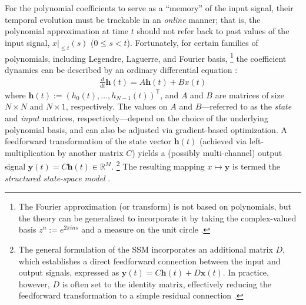 \documentclass[10pt,letterpaper]{article}
\begin{document}
For the polynomial coefficients to serve as a ``memory'' of the input signal, their temporal evolution must be trackable in an \emph{online} manner; that is, the polynomial approximation at time $t$ should not refer back to past values of the input signal, $x|_{\leq t}(s)$ ($0 \leq s <t$).
Fortunately, for certain families of polynomials, including Legendre, Laguerre, and Fourier basis,%
\footnote{
	The Fourier approximation (or transform) is not based on polynomials, but the theory can be generalized to incorporate it by taking the complex-valued basis $z^n := e^{2\pi ins}$ and a measure on the unit circle \citep{Gu+20}.
}
the coefficient dynamics can be described by an ordinary differential equation \citep[ODE;][]{Gu+20}:
\begin{align}
	\frac{d}{dt}\mathbf{h}(t) = A \mathbf{h}(t) + B x(t)
	\label{eq:ssm}
\end{align}
where $\mathbf{h}(t) := ( h_0(t), \dots, h_{N-1}(t) )^{\mathsf{T}}$,
and $A$ and $B$ are matrices of size $N \times N$ and $N \times 1$, respectively.
The values on $A$ and $B$---referred to as the \emph{state} and \emph{input} matrices, respectively---depend on the choice of the underlying polynomial basis, and can also be adjusted via gradient-based optimization.
A feedforward transformation of the state vector $\mathbf{h}(t)$ (achieved via left-multiplication by another matrix $C$) yields a (possibly multi-channel) output signal $\mathbf{y}(t) = C \mathbf{h}(t) \in \mathbb{R}^{M}$.%
\footnote{
	The general formulation of the SSM incorporates an additional matrix $D$, which establishes a direct feedforward connection between the input and output signals, expressed as $\mathbf{y}(t) = C \mathbf{h}(t) + D \mathbf{x}(t)$.
	In practice, however, $D$ is often set to the identity matrix, effectively reducing the feedforward transformation to a simple residual connection \citep{He+16_ResNet}.
}
The resulting mapping $x \mapsto \mathbf{y}$ is termed the \emph{structured state-space model} \citep[hereinafter abbreviated as \emph{SSM};][]{Gu+21,Gu+22}.



\end{document}
